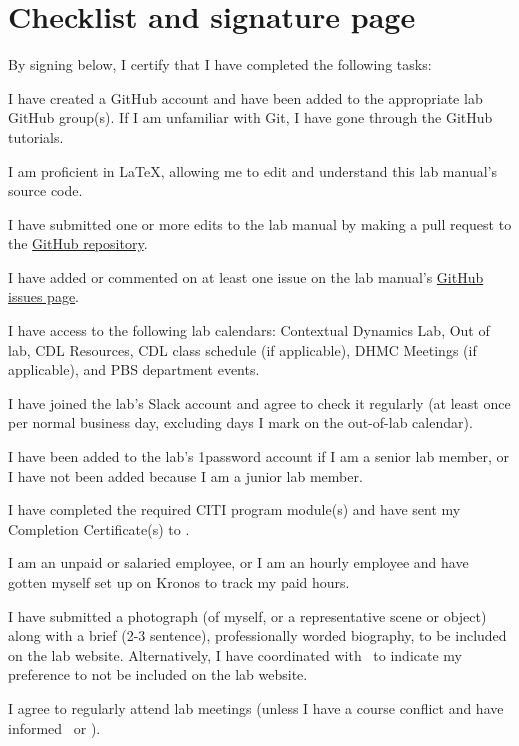 \documentclass{tufte-book} %
\begin{document}
   \chapter{Checklist and signature page}
   By signing below, I certify that I have completed the following tasks:
\begin{todolist}
  \item I have created a GitHub account and have been added to the appropriate lab
    GitHub group(s).  If I am unfamiliar with Git, I have gone through
    the GitHub tutorials.
  \item I am proficient in \LaTeX, allowing me to edit and understand
  this lab manual's source code.
  \item I have submitted one or more edits to the lab manual by making a
  pull request to the
  \href{https://github.com/ContextLab/lab-manual}{GitHub repository}.
  \item I have added or commented on at least one issue on the lab manual's
\href{https://github.com/ContextLab/lab-manual/issues}{GitHub issues page}.
  \item I have access to the following lab calendars:
    Contextual Dynamics Lab, Out of lab, CDL Resources, CDL class
    schedule (if applicable), DHMC Meetings (if
    applicable), and PBS department events.
   \item I have joined the lab's Slack account and agree to check it
  regularly (at least once per normal business day, excluding days I
  mark on the out-of-lab calendar).
  \item I have been added to the lab's 1password account if I am a
    senior lab member, or I have not been added because I am a junior
    lab member.
  \item I have completed the required CITI program module(s) and have sent my 
    Completion Certificate(s) to \coordinator.
  \item I am an unpaid or salaried employee, or I am an hourly
    employee and have gotten myself set up on Kronos to track my paid
    hours.
  \item I have submitted a photograph (of myself, or a
    representative scene or object) along with a brief (2-3 sentence),
    professionally worded biography, to be included on the lab
    website.  Alternatively, I have coordinated with \coordinator~to indicate my
    preference to not be included on the lab website.
  \item I agree to regularly attend lab meetings (unless I have a course
    conflict and have informed \director~or \coordinator).

\end{todolist}
\end{document}
